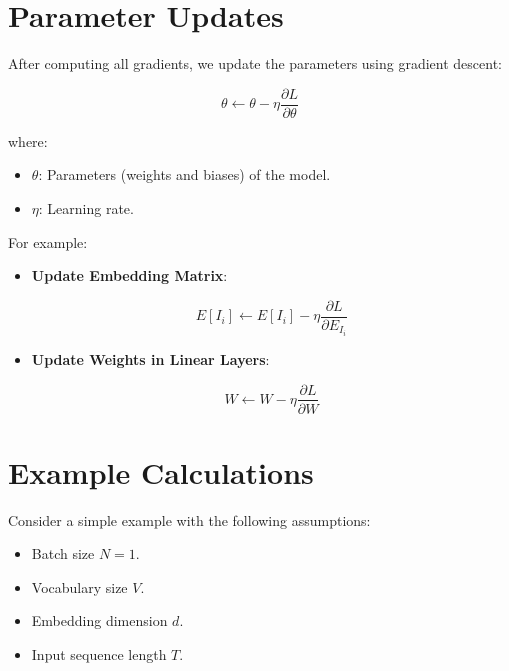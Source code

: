 \documentclass{article}
\begin{document}
\section{Parameter Updates}

After computing all gradients, we update the parameters using gradient descent:

\begin{equation}
    \theta \leftarrow \theta - \eta \frac{\partial L}{\partial \theta}
\end{equation}

where:

\begin{itemize}
    \item $\theta$: Parameters (weights and biases) of the model.
    \item $\eta$: Learning rate.
\end{itemize}

For example:

\begin{itemize}
    \item \textbf{Update Embedding Matrix}:

    \begin{equation}
        E[I_i] \leftarrow E[I_i] - \eta \frac{\partial L}{\partial E_{I_i}}
    \end{equation}

    \item \textbf{Update Weights in Linear Layers}:

    \begin{equation}
        W \leftarrow W - \eta \frac{\partial L}{\partial W}
    \end{equation}
\end{itemize}

\section{Example Calculations}

Consider a simple example with the following assumptions:

\begin{itemize}
    \item Batch size $N = 1$.
    \item Vocabulary size $V$.
    \item Embedding dimension $d$.
    \item Input sequence length $T$.
\end{itemize}
\end{document}
